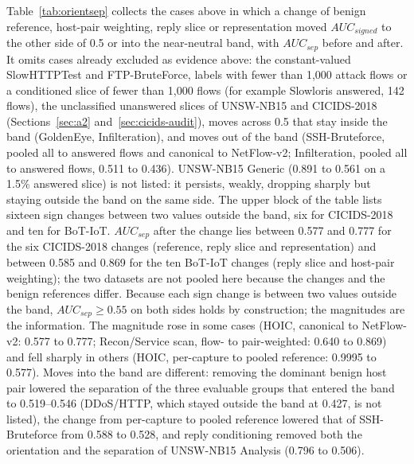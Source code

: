 \documentclass[preprint,12pt]{elsarticle}
\begin{document}
Table~\ref{tab:orientsep} collects the cases above in which a change of benign reference, host-pair weighting, reply slice or representation moved $AUC_{signed}$ to the other side of 0.5 or into the near-neutral band, with $AUC_{sep}$ before and after. It omits cases already excluded as evidence above: the constant-valued SlowHTTPTest and FTP-BruteForce, labels with fewer than 1{,}000 attack flows or a conditioned slice of fewer than 1{,}000 flows (for example Slowloris answered, 142 flows), the unclassified unanswered slices of UNSW-NB15 and CICIDS-2018 (Sections~\ref{sec:a2} and~\ref{sec:cicids-audit}), moves across 0.5 that stay inside the band (GoldenEye, Infilteration), and moves out of the band (SSH-Bruteforce, pooled all to answered flows and canonical to NetFlow-v2; Infilteration, pooled all to answered flows, 0.511 to 0.436). UNSW-NB15 Generic (0.891 to 0.561 on a 1.5\% answered slice) is not listed: it persists, weakly, dropping sharply but staying outside the band on the same side. The upper block of the table lists sixteen sign changes between two values outside the band, six for CICIDS-2018 and ten for BoT-IoT. $AUC_{sep}$ after the change lies between 0.577 and 0.777 for the six CICIDS-2018 changes (reference, reply slice and representation) and between 0.585 and 0.869 for the ten BoT-IoT changes (reply slice and host-pair weighting); the two datasets are not pooled here because the changes and the benign references differ. Because each sign change is between two values outside the band, $AUC_{sep}\ge 0.55$ on both sides holds by construction; the magnitudes are the information. The magnitude rose in some cases (HOIC, canonical to NetFlow-v2: 0.577 to 0.777; Recon/Service scan, flow- to pair-weighted: 0.640 to 0.869) and fell sharply in others (HOIC, per-capture to pooled reference: 0.9995 to 0.577). Moves into the band are different: removing the dominant benign host pair lowered the separation of the three evaluable groups that entered the band to 0.519--0.546 (DDoS/HTTP, which stayed outside the band at 0.427, is not listed), the change from per-capture to pooled reference lowered that of SSH-Bruteforce from 0.588 to 0.528, and reply conditioning removed both the orientation and the separation of UNSW-NB15 Analysis (0.796 to 0.506).
\end{document}

